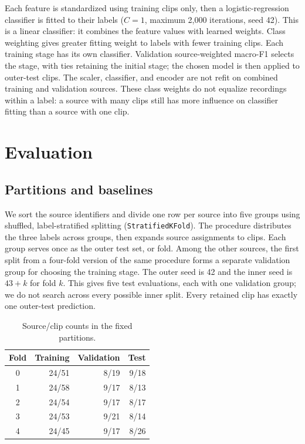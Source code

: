 \documentclass[10pt,twocolumn,letterpaper]{article}
\begin{document}
Each feature is standardized using training clips only, then a logistic-regression classifier is fitted to their labels ($C=1$, maximum 2,000 iterations, seed 42). This is a linear classifier: it combines the feature values with learned weights. Class weighting gives greater fitting weight to labels with fewer training clips. Each training stage has its own classifier. Validation source-weighted macro-F1 selects the stage, with ties retaining the initial stage; the chosen model is then applied to outer-test clips. The scaler, classifier, and encoder are not refit on combined training and validation sources. These class weights do not equalize recordings within a label: a source with many clips still has more influence on classifier fitting than a source with one clip.

\section{Evaluation}
\subsection{Partitions and baselines}
We sort the source identifiers and divide one row per source into five groups using shuffled, label-stratified splitting (\texttt{StratifiedKFold}). The procedure distributes the three labels across groups, then expands source assignments to clips. Each group serves once as the outer test set, or fold. Among the other sources, the first split from a four-fold version of the same procedure forms a separate validation group for choosing the training stage. The outer seed is 42 and the inner seed is $43+k$ for fold $k$. This gives five test evaluations, each with one validation group; we do not search across every possible inner split. Every retained clip has exactly one outer-test prediction.

\begin{table}[t]
\centering
\caption{Source/clip counts in the fixed partitions.}
\label{tab:splits}
\begin{tabular}{crrr}
\toprule
Fold & Training & Validation & Test\\
\midrule
0&24/51&8/19&9/18\\
1&24/58&9/17&8/13\\
2&24/54&9/17&8/17\\
3&24/53&9/21&8/14\\
4&24/45&9/17&8/26\\
\bottomrule
\end{tabular}
\end{table}
\end{document}
